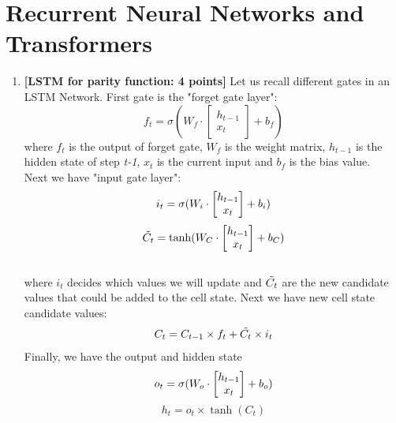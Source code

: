 \documentclass[11pt,english]{article}
\begin{document}
\section{Recurrent Neural Networks and Transformers}
\begin{enumerate}[resume]

\item
\textbf{[LSTM for parity function: 4 points]}
Let us recall different gates in an LSTM Network. First gate is the "forget gate layer":\\
\begin{equation}
    f_t = \sigma (W_f \cdot \begin{bmatrix} h_{t-1} \\ x_t \end{bmatrix} + b_f)
\end{equation}
where $f_t$ is the output of forget gate, $W_f$ is the weight matrix, $h_{t-1}$ is the hidden state of step \textit{t-1}, $x_t$ is the current input and $b_f$ is the bias value. \\
Next we have "input gate layer":\\
\begin{equation}
    i_t = \sigma (W_i\cdot \begin{bmatrix} h_{t-1} \\ x_t \end{bmatrix} + b_i) \\
\end{equation}
\begin{equation}
    \Tilde{C_{t}} = \tanh (W_C\cdot \begin{bmatrix} h_{t-1} \\ x_t \end{bmatrix} + b_C) 
\end{equation} \\
where $i_t$ decides which values we will update and $\Tilde{C_{t}}$ are the new candidate values that could be added to the cell state. Next we have new cell state candidate values:
\begin{equation}
    C_t = C_{t-1} \times f_t + \Tilde{C_{t}} \times i_t 
    \label{eqn:xor}
\end{equation}
Finally, we have the output and hidden state
\begin{equation}
   o_t = \sigma (W_o \cdot \begin{bmatrix} h_{t-1} \\ x_t \end{bmatrix} + b_o) \\
\end{equation}
\begin{equation}
    h_t = o_t \times \tanh(C_t)
\end{equation}


\end{enumerate}
\end{document}
